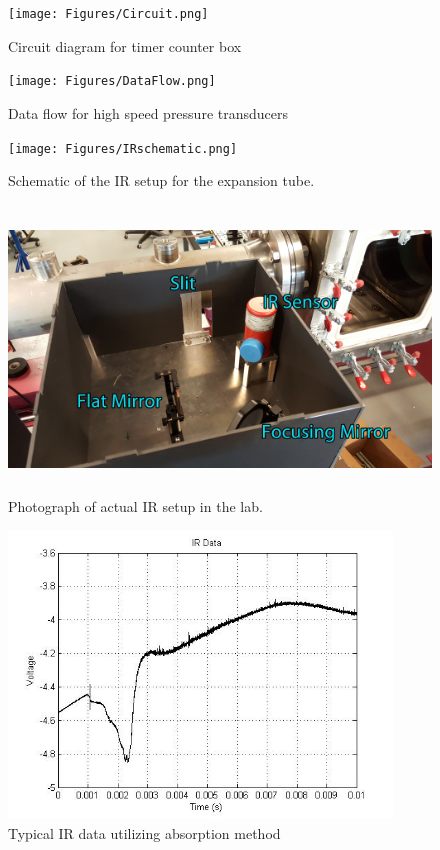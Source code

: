 \begin{figure}
\centering
\texttt{[image: Figures/Circuit.png]}
\caption[Circuit Diagram for Timer Counter Box]{Circuit diagram for timer counter box}
\label{fig:timercircuit}
\end{figure}


\begin{figure}[p!]
\centering
\texttt{[image: Figures/DataFlow.png]}
\caption[Data Flow for High Speed Pressure Transducers]{Data flow for high speed pressure transducers}
\label{fig:DataFlow}
\end{figure}
\clearpage

\begin{figure}
\centering
\texttt{[image: Figures/IRschematic.png]}
\caption[IR setup diagram]{Schematic of the IR setup for the expansion tube.}
\label{fig:IRschematic}
\end{figure}

\begin{figure}
\centering
\includegraphics[height = 3in]{Figures/IRLabeled.jpg}
\caption[Labeled photograph of IR setup]{Photograph of actual IR setup in the lab.}
\label{fig:IRlabel}
\end{figure}

\begin{figure}
\centering
\includegraphics[height = 3in]{Figures/absorption.jpg}
\caption[Typical IR data utilizing absorption method]{Typical IR data utilizing absorption method}
\label{fig:IRabsorption}
\end{figure}

